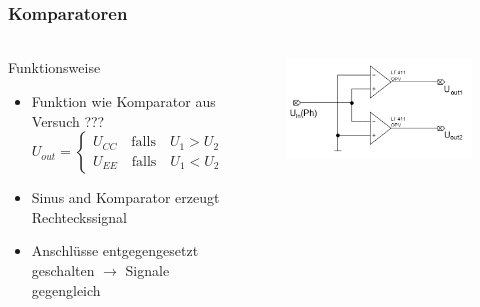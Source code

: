 \begin{frame}
\frametitle{Komparatoren}
\framesubtitle{}
    \begin{columns}[c]
            \begin{block}{Funktionsweise}
                 \begin{itemize}
                     \item Funktion wie Komparator aus Versuch ??? 
                        \begin{equation*}
                        U_{out}=
                            \begin{cases} 
                                U_{CC} \quad \text{falls} \quad U_1 > U_2 \\
                                U_{EE} \quad \text{falls} \quad U_1 < U_2
                            \end{cases}
                        \end{equation*}
                    \item Sinus and Komparator erzeugt Rechteckssignal
                     \item Anschlüsse entgegengesetzt geschalten $\rightarrow$ Signale
                     gegengleich
                 \end{itemize}
            \end{block}
            \begin{figure}[H]
            \begin{center}
                    \includegraphics[scale=0.3]{./img/schaltung/Komparatoren.png}
            \end{center}
            \end{figure}
    \end{columns}
\end{frame}

